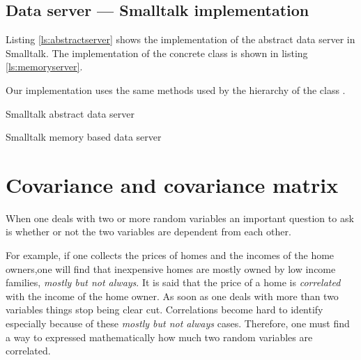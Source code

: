 
\subsection{Data server --- Smalltalk implementation}
\label{sec:sdataserver} Listing \ref{ls:abstractserver} shows the
implementation of the abstract data server in Smalltalk. The
implementation of the concrete class is shown in listing
\ref{ls:memoryserver}.

\noindent Our implementation uses the same methods used by the
hierarchy of the class .

\begin{listing} Smalltalk abstract data server \label{ls:abstractserver}

\end{listing}
\begin{listing} Smalltalk memory based data server \label{ls:memoryserver}

\end{listing}

\section{Covariance and covariance matrix}
\label{sec:covmatrix} When one deals with two or more random
variables an important question to ask is whether or not the two
variables are dependent from each other.

For example, if one collects the prices of homes and the incomes
of the home owners,one will find that inexpensive homes are mostly
owned by low income families, \textsl{mostly but not always}. It is
said that the price of a home is \textsl{correlated} with the income
of the home owner. As soon as one deals with more than two
variables things stop being clear cut. Correlations become hard to
identify especially because of these \textsl{mostly but not always}
cases. Therefore, one must find a way to expressed mathematically
how much two random variables are correlated.

